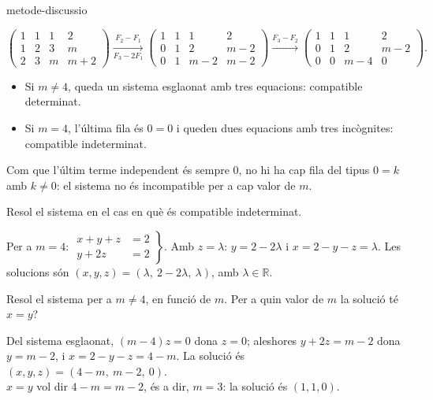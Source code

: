 \begin{apartats}
\begin{tria}{metode-discussio}
\begin{solucio}
\[
\left(\begin{array}{ccc|c}1&1&1&2\\1&2&3&m\\2&3&m&m+2\end{array}\right)
\xrightarrow[F_3-2F_1]{F_2-F_1}
\left(\begin{array}{ccc|c}1&1&1&2\\0&1&2&m-2\\0&1&m-2&m-2\end{array}\right)
\xrightarrow{F_3-F_2}
\left(\begin{array}{ccc|c}1&1&1&2\\0&1&2&m-2\\0&0&m-4&0\end{array}\right).
\]
\begin{itemize}
\item Si $m\ne4$, queda un sistema esglaonat amb tres equacions: compatible determinat.
\item Si $m=4$, l'última fila és $0=0$ i queden dues equacions amb tres incògnites: compatible
indeterminat.
\end{itemize}
Com que l'últim terme independent és sempre 0, no hi ha cap fila del tipus $0=k$ amb $k\ne0$: el
sistema no és incompatible per a cap valor de $m$.
\end{solucio}
\end{tria}

Resol el sistema en el cas en què és compatible indeterminat.

\begin{solucio}
Per a $m=4$: $\left.\begin{aligned}x+y+z&=2\\y+2z&=2\end{aligned}\right\}$. Amb $z=\lambda$:
$y=2-2\lambda$ i $x=2-y-z=\lambda$. Les solucions són $(x,y,z)=(\lambda,\ 2-2\lambda,\ \lambda)$, amb
$\lambda\in\mathbb R$.
\end{solucio}

\begin{nomesllarg}
Resol el sistema per a $m\ne4$, en funció de $m$. Per a quin valor de $m$ la solució té $x=y$?

\begin{solucio}
Del sistema esglaonat, $(m-4)z=0$ dona $z=0$; aleshores $y+2z=m-2$ dona $y=m-2$, i
$x=2-y-z=4-m$. La solució és $(x,y,z)=(4-m,\ m-2,\ 0)$.\\
$x=y$ vol dir $4-m=m-2$, és a dir, $m=3$: la solució és $(1,1,0)$.
\end{solucio}
\end{nomesllarg}

\end{apartats}
